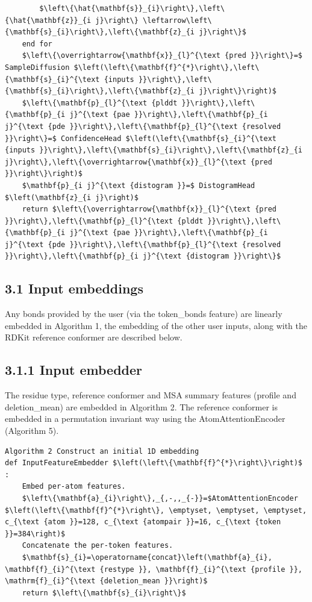 \documentclass[10pt]{article}
\begin{document}
\begin{verbatim}
        $\left\{\hat{\mathbf{s}}_{i}\right\},\left\{\hat{\mathbf{z}}_{i j}\right\} \leftarrow\left\{\mathbf{s}_{i}\right\},\left\{\mathbf{z}_{i j}\right\}$
    end for
    $\left\{\overrightarrow{\mathbf{x}}_{l}^{\text {pred }}\right\}=$ SampleDiffusion $\left(\left\{\mathbf{f}^{*}\right\},\left\{\mathbf{s}_{i}^{\text {inputs }}\right\},\left\{\mathbf{s}_{i}\right\},\left\{\mathbf{z}_{i j}\right\}\right)$
    $\left\{\mathbf{p}_{l}^{\text {plddt }}\right\},\left\{\mathbf{p}_{i j}^{\text {pae }}\right\},\left\{\mathbf{p}_{i j}^{\text {pde }}\right\},\left\{\mathbf{p}_{l}^{\text {resolved }}\right\}=$ ConfidenceHead $\left(\left\{\mathbf{s}_{i}^{\text {inputs }}\right\},\left\{\mathbf{s}_{i}\right\},\left\{\mathbf{z}_{i j}\right\},\left\{\overrightarrow{\mathbf{x}}_{l}^{\text {pred }}\right\}\right)$
    $\mathbf{p}_{i j}^{\text {distogram }}=$ DistogramHead $\left(\mathbf{z}_{i j}\right)$
    return $\left\{\overrightarrow{\mathbf{x}}_{l}^{\text {pred }}\right\},\left\{\mathbf{p}_{l}^{\text {plddt }}\right\},\left\{\mathbf{p}_{i j}^{\text {pae }}\right\},\left\{\mathbf{p}_{i j}^{\text {pde }}\right\},\left\{\mathbf{p}_{l}^{\text {resolved }}\right\},\left\{\mathbf{p}_{i j}^{\text {distogram }}\right\}$
\end{verbatim}

\subsection*{3.1 Input embeddings}
Any bonds provided by the user (via the token\_bonds feature) are linearly embedded in Algorithm 1, the embedding of the other user inputs, along with the RDKit reference conformer are described below.

\subsection*{3.1.1 Input embedder}
The residue type, reference conformer and MSA summary features (profile and deletion\_mean) are embedded in Algorithm 2. The reference conformer is embedded in a permutation invariant way using the AtomAttentionEncoder (Algorithm 5).

\begin{verbatim}
Algorithm 2 Construct an initial 1D embedding
def InputFeatureEmbedder $\left(\left\{\mathbf{f}^{*}\right\}\right)$ :
    Embed per-atom features.
    $\left\{\mathbf{a}_{i}\right\},_{,-,,_{-}}=$AtomAttentionEncoder $\left(\left\{\mathbf{f}^{*}\right\}, \emptyset, \emptyset, \emptyset, c_{\text {atom }}=128, c_{\text {atompair }}=16, c_{\text {token }}=384\right)$
    Concatenate the per-token features.
    $\mathbf{s}_{i}=\operatorname{concat}\left(\mathbf{a}_{i}, \mathbf{f}_{i}^{\text {restype }}, \mathbf{f}_{i}^{\text {profile }}, \mathrm{f}_{i}^{\text {deletion_mean }}\right)$
    return $\left\{\mathbf{s}_{i}\right\}$
\end{verbatim}
\end{document}
